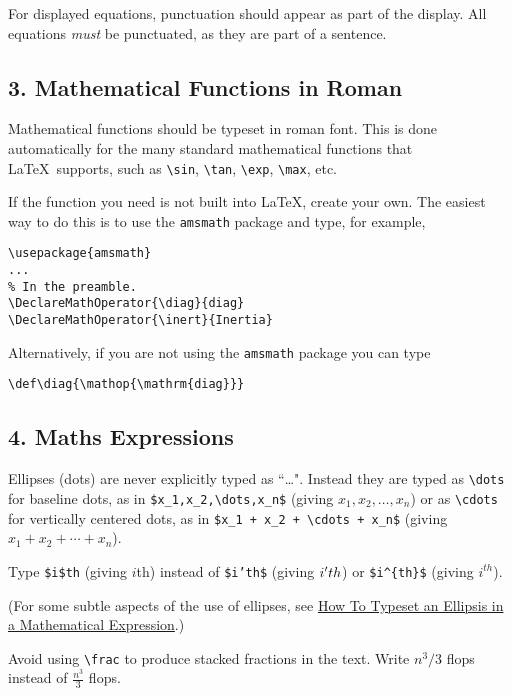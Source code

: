 \documentclass[12pt]{extarticle}
\begin{document}
For displayed equations, punctuation should appear as part of the display.
All equations \emph{must} be punctuated, as they are part of a sentence.

\subsection*{3. Mathematical Functions in Roman}
\label{sec-1-3}
Mathematical functions should be typeset in roman font.
This is done automatically for the many standard mathematical functions that 
\LaTeX\ supports, such as 
\texttt{\textbackslash{}sin},
\texttt{\textbackslash{}tan},
\texttt{\textbackslash{}exp},
\texttt{\textbackslash{}max},
etc.

If the function you need is not built into \LaTeX, create your own.
The easiest way to do this is to use the \texttt{amsmath} package and type,
for example,
\begin{verbatim}
\usepackage{amsmath}
...
% In the preamble.
\DeclareMathOperator{\diag}{diag}  
\DeclareMathOperator{\inert}{Inertia}
\end{verbatim}
Alternatively, if you are not using the \texttt{amsmath} package you can type
\begin{verbatim}
\def\diag{\mathop{\mathrm{diag}}}
\end{verbatim}

\subsection*{4. Maths Expressions}
\label{sec-1-4}
Ellipses (dots) are never explicitly typed as ``\ldots{}".
Instead they are typed as \texttt{\textbackslash{}dots} for baseline dots,
as in 
\texttt{\$x\_1,x\_2,\textbackslash{}dots,x\_n\$}
(giving $x_1,x_2,\dots,x_n$)
or as \texttt{\textbackslash{}cdots} for vertically centered dots, as in 
\texttt{\$x\_1 + x\_2 + \textbackslash{}cdots + x\_n\$}
(giving $x_1 + x_2 + \cdots + x_n$).

Type \texttt{\$i\$th} 
(giving $i$th)
instead of \texttt{\$i'th\$} (giving $i\rq th$)
or \texttt{\$i\textasciicircum{}\{th\}\$} (giving $i^{th}$).

(For some subtle aspects of the use of ellipses,
see \href{https://nickhigham.wordpress.com/2014/02/06/how-to-typeset-an-ellipsis-in-a-mathematical-expression}{How To Typeset an Ellipsis in a Mathematical Expression}.)

Avoid using \texttt{\textbackslash{}frac} to produce stacked fractions in the text.  Write
$n^3/3$ flops instead of $\frac{n^3}{3}$ flops.
\end{document}
